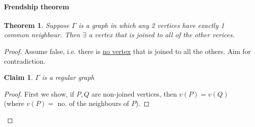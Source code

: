 \documentclass[]{article}
\newtheorem{thm}{Theorem}[section]
\newtheorem*{clm}{Claim}
\theoremstyle{definition}
\theoremstyle{remark}
\numberwithin{equation}{section}
\begin{document}
			\paragraph{Frendship theorem}
				\begin{thm}
				Suppose $\Gamma$ is a graph in which any 2 vertices have exactly 1 common neighbour. Then $\exists$ a vertex that is joined to all of the other verices.
				\end{thm}
				\begin{proof}
					Assume false, i.e. there is \underline{no vertex} that is joined to all the others. Aim for contradiction.
					\begin{clm}$\Gamma$ is a regular graph
					\end{clm}
					\begin{proof}
						First we show, if $P, Q$ are non-joined vertices, then $v(P) = v(Q)$ (where $v(P) = $ no. of the neighbours of $P$).



\end{proof}
\end{proof}
\end{document}
